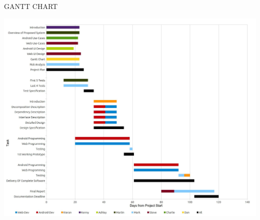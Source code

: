 \documentclass{article}
\begin{document}
	\newpage
	\begin{section}{GANTT CHART}
		\begin{center}
		\includegraphics[height=1\columnwidth, angle=90]{./Diagrams/GanttChart/GanttChart.jpg}
		\end{center}
	\end{section}
	
\end{document}
